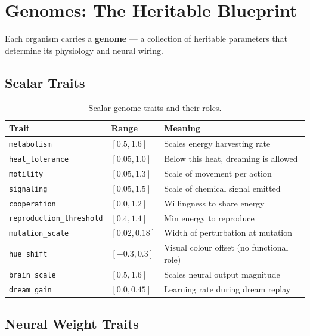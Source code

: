 \documentclass[12pt,a4paper]{article}
\begin{document}
\section{Genomes: The Heritable Blueprint}

Each organism carries a \textbf{genome} — a collection of
heritable parameters that determine its physiology and neural wiring.

\subsection{Scalar Traits}

\begin{table}[h]
\centering
\renewcommand{\arraystretch}{1.3}
\begin{tabular}{lll}
\toprule
\textbf{Trait} & \textbf{Range} & \textbf{Meaning} \\
\midrule
\texttt{metabolism} & $[0.5, 1.6]$ & Scales energy harvesting rate \\
\texttt{heat\_tolerance} & $[0.05, 1.0]$ & Below this heat, dreaming is allowed \\
\texttt{motility} & $[0.05, 1.3]$ & Scale of movement per action \\
\texttt{signaling} & $[0.05, 1.5]$ & Scale of chemical signal emitted \\
\texttt{cooperation} & $[0.0, 1.2]$ & Willingness to share energy \\
\texttt{reproduction\_threshold} & $[0.4, 1.4]$ & Min energy to reproduce \\
\texttt{mutation\_scale} & $[0.02, 0.18]$ & Width of perturbation at mutation \\
\texttt{hue\_shift} & $[-0.3, 0.3]$ & Visual colour offset (no functional role) \\
\texttt{brain\_scale} & $[0.5, 1.6]$ & Scales neural output magnitude \\
\texttt{dream\_gain} & $[0.0, 0.45]$ & Learning rate during dream replay \\
\bottomrule
\end{tabular}
\caption{Scalar genome traits and their roles.}
\end{table}

\subsection{Neural Weight Traits}
\end{document}
